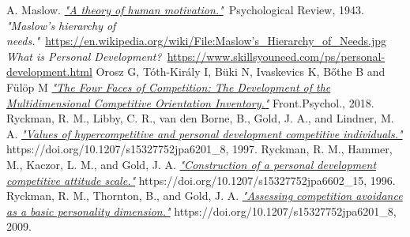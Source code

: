 \documentclass[twoside]{ctuthesis}
\begin{document}
    \maketitle
    
    
    
    
    
    
    
    

    
    \begin{thebibliography}{99}
         A. Maslow. \href{http://psychclassics.yorku.ca/Maslow/motivation.htm}{\emph{"A theory of human motivation."}}~Psychological Review, 1943.
         \emph{"Maslow's hierarchy of needs."}~\href{https://en.wikipedia.org/wiki/File:Maslow's_Hierarchy_of_Needs.jpg}{https://en.wikipedia.org/wiki/File:Maslow's\_Hierarchy\_of\_Needs.jpg}
         \emph{What is Personal Development?}~\href{https://www.skillsyouneed.com/ps/personal-development.html}{https://www.skillsyouneed.com/ps/personal-development.html}
         Orosz G, Tóth-Király I, Büki N, Ivaskevics K, Bőthe B and Fülöp M \href{https://www.frontiersin.org/articles/10.3389/fpsyg.2018.00779/full}{\emph{"The Four Faces of Competition: The Development of the Multidimensional Competitive Orientation Inventory."}} Front.Psychol., 2018.
         Ryckman, R. M., Libby, C. R., van den Borne, B., Gold, J. A., and Lindner, M. A. \href{https://doi.org/10.1207/s15327752jpa6201_8}{\emph{"Values of hypercompetitive and personal development competitive individuals."}} https://doi.org/10.1207/s15327752jpa6201\_8, 1997.
         Ryckman, R. M., Hammer, M., Kaczor, L. M., and Gold, J. A. \href{https://doi.org/10.1207/s15327752jpa6602_15}{\emph{"Construction of a personal development competitive attitude scale."}} https://doi.org/10.1207/s15327752jpa6602\_15, 1996.
         Ryckman, R. M., Thornton, B., and Gold, J. A. \href{https://doi.org/10.1207/s15327752jpa6201_8}{\emph{"Assessing competition avoidance as a basic personality dimension."}} https://doi.org/10.1207/s15327752jpa6201\_8, 2009.
    \end{thebibliography}
\end{document}
